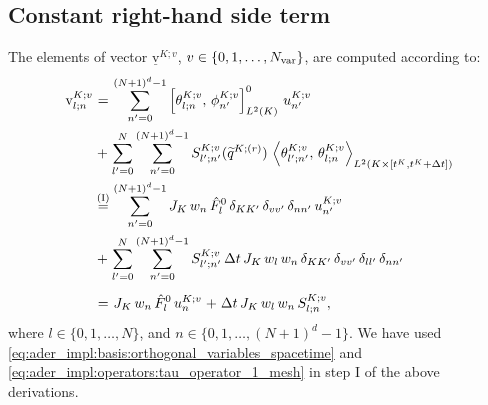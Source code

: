 \documentclass{scrreprt}
\theoremstyle{definition}
\theoremstyle{nonumberplain}
\newcommand{\laVec}[1]{\underline{\mathrm{#1}}}
\newcommand{\laVecel}[1]{\mathrm{#1}}
\newcommand{\cell}{K}
\newcommand{\detJ}{J_\cell}
\begin{document}
\subsection{Constant right-hand side term}
The elements of vector
$\laVec{v}^{\cell;v}$, $v\in\{0,1,\ldots,N_\textup{var}\}$, are computed
according to:
\begin{align*}
\laVecel{v}^{\cell;v}_{l;n}
&
\overset{\phantom{\textup{(I)}}}{=}
\sum_{n'=0}^{(N+1)^{d}-1}
\left[\theta^{\cell;v}_{l;n},\,\phi^{\cell;v}_{n'}\right]^{0}_{L^2(\cell)}
\,
u^{\cell;v}_{n'}
\\
&
\overset{\phantom{\textup{(I)}}}{+}
\sum_{l'=0}^{N}
\sum_{n'=0}^{(N+1)^{d}-1}
S^{\cell;v}_{l';n'}
(\widetilde{q}^{\cell;(r)})
\,
\left\langle
\theta^{\cell;v}_{l';n'},\,
\theta^{\cell;v}_{l;n}
\right\rangle
_{L^2(\cell\times[t^\cell,t^\cell+\Delta t])}
\\
&\overset{\textup{(I)}}=
\sum_{n'=0}^{(N+1)^{d}-1}
\detJ\,
w_{n}\,
\hat{F}^0_l\,
\delta_{\cell\cell'}\,\delta_{vv'}\,
\delta_{n n'}
\,
u^{\cell;v}_{n'}
\\
&
\overset{\phantom{\textup{(I)}}}{+}
\sum_{l'=0}^{N}
\sum_{n'=0}^{(N+1)^{d}-1}
S^{\cell;v}_{l';n'}\,
\Delta t\,\detJ\,w_{l}\,w_{n}\,
\delta_{\cell\cell'}\,\delta_{vv'}\,\delta_{l l'}\,\delta_{n n'}
\\
&
\overset{\phantom{\textup{(I)}}}{=}
\detJ\,
w_{n}\,
\hat{F}^0_l\,
u^{\cell;v}_{n}
\overset{\phantom{\textup{(I)}}}{+}
\Delta t\,\detJ\,w_{l}\,w_{n}\,
S^{\cell;v}_{l;n},
\end{align*}
where $l\in\{0,1,\ldots,N\}$, and
$n\in\{0,1,\ldots,(N+1)^{d}-1\}$.
We have used
\eqref{eq:ader_impl:basis:orthogonal_variables_spacetime}
and 
\eqref{eq:ader_impl:operators:tau_operator_1_mesh}
in step I of the above derivations.
\end{document}

